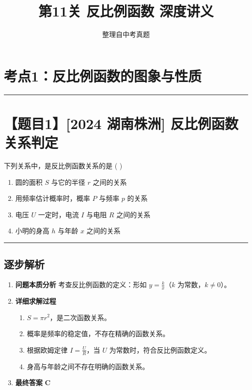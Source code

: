 \documentclass[UTF8]{ctexart}
\newenvironment{redenv}{\color{red}}{}
\newenvironment{detailedanalysis}{%
    \color{red}
    \begin{enumerate}[label=\textbf{第\arabic*步：}, leftmargin=*, align=left, itemsep=1.5ex]
}{%
    \end{enumerate}
}
\newcommand{\problemrule}{\noindent\rule{\textwidth}{1.5pt}\vspace{-0.8em}}
\newcommand{\analysisrule}{\noindent\rule{\textwidth}{0.8pt}\vspace{-0.8em}}
\begin{document}
\title{\textbf{ 第11关 反比例函数 深度讲义}}
\author{整理自中考真题}
\date{}
\maketitle

\section*{考点1：反比例函数的图象与性质}

\problemrule
\section*{【题目1】[2024 湖南株洲] 反比例函数关系判定}
下列关系中，是反比例函数关系的是 ( \quad )
\begin{enumerate}[label=\Alph*., itemsep=0pt]
    \item 圆的面积 $S$ 与它的半径 $r$ 之间的关系
    \item 用频率估计概率时，概率 $P$ 与频率 $p$ 的关系
    \item 电压 $U$ 一定时，电流 $I$ 与电阻 $R$ 之间的关系
    \item 小明的身高 $h$ 与年龄 $x$ 之间的关系
\end{enumerate}

\begin{redenv}
\analysisrule
\subsection*{逐步解析}

\begin{detailedanalysis}
\item \textbf{问题本质分析}
考查反比例函数的定义：形如 $y=\frac{k}{x}$（$k$ 为常数，$k \neq 0$）。

\item \textbf{详细求解过程}
\begin{enumerate}[label=\Alph*.]
    \item $S=\pi r^2$，是二次函数关系。
    \item 概率是频率的稳定值，不存在精确的函数关系。
    \item 根据欧姆定律 $I = \frac{U}{R}$，当 $U$ 为常数时，符合反比例函数定义。
    \item 身高与年龄之间不存在明确的函数关系。
\end{enumerate}

\item \textbf{最终答案}
\textbf{C}
\end{detailedanalysis}
\end{redenv}
\end{document}
